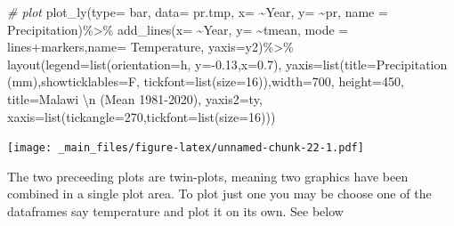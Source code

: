 \documentclass[
]{book}
\newenvironment{Shaded}{\begin{snugshade}}{\end{snugshade}}
\newcommand{\AttributeTok}[1]{\textcolor[rgb]{0.77,0.63,0.00}{#1}}
\newcommand{\CommentTok}[1]{\textcolor[rgb]{0.56,0.35,0.01}{\textit{#1}}}
\newcommand{\DecValTok}[1]{\textcolor[rgb]{0.00,0.00,0.81}{#1}}
\newcommand{\FloatTok}[1]{\textcolor[rgb]{0.00,0.00,0.81}{#1}}
\newcommand{\FunctionTok}[1]{\textcolor[rgb]{0.00,0.00,0.00}{#1}}
\newcommand{\NormalTok}[1]{#1}
\newcommand{\SpecialCharTok}[1]{\textcolor[rgb]{0.00,0.00,0.00}{#1}}
\newcommand{\StringTok}[1]{\textcolor[rgb]{0.31,0.60,0.02}{#1}}
\begin{document}
\begin{Shaded}
\begin{Highlighting}[]
\CommentTok{\# plot }
\FunctionTok{plot\_ly}\NormalTok{(}\AttributeTok{type=} \StringTok{\textquotesingle{}bar\textquotesingle{}}\NormalTok{, }\AttributeTok{data=}\NormalTok{ pr.tmp, }\AttributeTok{x=} \SpecialCharTok{\textasciitilde{}}\NormalTok{Year, }\AttributeTok{y=} \SpecialCharTok{\textasciitilde{}}\NormalTok{pr, }\AttributeTok{name =} \StringTok{\textquotesingle{}Precipitation\textquotesingle{}}\NormalTok{)}\SpecialCharTok{\%\textgreater{}\%}
 \FunctionTok{add\_lines}\NormalTok{(}\AttributeTok{x=} \SpecialCharTok{\textasciitilde{}}\NormalTok{Year, }\AttributeTok{y=} \SpecialCharTok{\textasciitilde{}}\NormalTok{tmean, }\AttributeTok{mode =} \StringTok{\textquotesingle{}lines+markers\textquotesingle{}}\NormalTok{,}\AttributeTok{name=} \StringTok{\textquotesingle{}Temperature\textquotesingle{}}\NormalTok{, }\AttributeTok{yaxis=}\StringTok{\textquotesingle{}y2\textquotesingle{}}\NormalTok{)}\SpecialCharTok{\%\textgreater{}\%}
    \FunctionTok{layout}\NormalTok{(}\AttributeTok{legend=}\FunctionTok{list}\NormalTok{(}\AttributeTok{orientation=}\StringTok{\textquotesingle{}h\textquotesingle{}}\NormalTok{, }\AttributeTok{y=}\SpecialCharTok{{-}}\FloatTok{0.13}\NormalTok{,}\AttributeTok{x=}\FloatTok{0.7}\NormalTok{), }
                   \AttributeTok{yaxis=}\FunctionTok{list}\NormalTok{(}\AttributeTok{title=}\StringTok{\textquotesingle{}Precipitation (mm)\textquotesingle{}}\NormalTok{,}\AttributeTok{showticklables=}\NormalTok{F, }\AttributeTok{tickfont=}\FunctionTok{list}\NormalTok{(}\AttributeTok{size=}\DecValTok{16}\NormalTok{)),}\AttributeTok{width=}\DecValTok{700}\NormalTok{, }\AttributeTok{height=}\DecValTok{450}\NormalTok{, }\AttributeTok{title=}\StringTok{\textquotesingle{}Malawi }\SpecialCharTok{\textbackslash{}n}\StringTok{ (Mean 1981{-}2020)\textquotesingle{}}\NormalTok{, }
                   \AttributeTok{yaxis2=}\NormalTok{ty, }\AttributeTok{xaxis=}\FunctionTok{list}\NormalTok{(}\AttributeTok{tickangle=}\DecValTok{270}\NormalTok{,}\AttributeTok{tickfont=}\FunctionTok{list}\NormalTok{(}\AttributeTok{size=}\DecValTok{16}\NormalTok{)))}
\end{Highlighting}
\end{Shaded}

\texttt{[image: \_main\_files/figure-latex/unnamed-chunk-22-1.pdf]}

The two preceeding plots are twin-plots, meaning two graphics have been combined in a single plot area.
To plot just one you may be choose one of the dataframes say temperature and plot it on its own. See below
\end{document}
